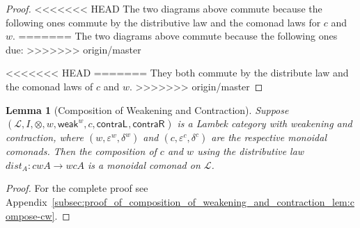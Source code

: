 \documentclass{article}
\newtheorem{lemma}[theorem]{Lemma}
\let\mto\to
\let\to\relax
\newcommand{\to}{\rightarrow}
\newcommand{\cat}[1]{\mathcal{#1}}
\newcommand{\w}[1]{\mathsf{weak}_{#1}}
\newcommand{\cL}[1]{\mathsf{contraL}_{#1}}
\newcommand{\cR}[1]{\mathsf{contraR}_{#1}}
\begin{document}
\begin{proof}
<<<<<<< HEAD
  The two diagrams above commute because the following ones commute by the
  distributive law and the comonad laws for $c$ and $w$.
=======
  The two diagrams above commute because the following ones due:
>>>>>>> origin/master
<<<<<<< HEAD
=======
  They both commute by the distribute law and the comonad laws of $c$
  and $w$.
>>>>>>> origin/master
\end{proof}

\begin{lemma}[Composition of Weakening and Contraction]
  \label{lem:compose-cw}
  Suppose \\ $(\cat{L},I,\otimes,w,\w{}^w,c,\cL{},\cR{})$ is a Lambek
  category with weakening and contraction, where
  $(w,\varepsilon^w,\delta^w)$ and $(c,\varepsilon^c,\delta^c)$ are
  the respective monoidal comonads. Then the composition of $c$ and
  $w$ using the distributive law $dist_A:cwA\mto wcA$ is a monoidal
  comonad on $\cat{L}$.
\end{lemma}
\begin{proof}
  For the complete proof see
  Appendix~\ref{subsec:proof_of_composition_of_weakening_and_contraction_lem:compose-cw}.
\end{proof}
\end{document}
